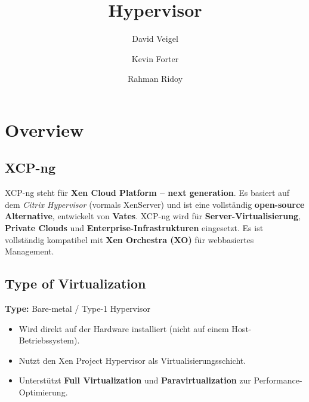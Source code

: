 \documentclass[BMR,Seminar,ngerman,IEEE]{twbook}
\title{Hypervisor}
\author{David Veigel \and Kevin Forter \and Rahman Ridoy}
\begin{document}
\maketitle

\onecolumn
\newpage

\chapter{Overview}

\section{XCP-ng}
XCP-ng steht für \textbf{Xen Cloud Platform – next generation}.  
Es basiert auf dem \textit{Citrix Hypervisor} (vormals XenServer) und ist eine vollständig \textbf{open-source Alternative}, entwickelt von \textbf{Vates}.  
XCP-ng wird für \textbf{Server-Virtualisierung}, \textbf{Private Clouds} und \textbf{Enterprise-Infrastrukturen} eingesetzt.  
Es ist vollständig kompatibel mit \textbf{Xen Orchestra (XO)} für webbasiertes Management.

\section{Type of Virtualization}
\textbf{Type:} Bare-metal / Type-1 Hypervisor  

\begin{itemize}[noitemsep]
  \item Wird direkt auf der Hardware installiert (nicht auf einem Host-Betriebssystem).
  \item Nutzt den Xen Project Hypervisor als Virtualisierungsschicht.
  \item Unterstützt \textbf{Full Virtualization} und \textbf{Paravirtualization} zur Performance-Optimierung.
\end{itemize}

\end{document}
